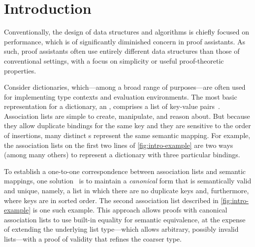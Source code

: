 \section{Introduction}
\label{sec:Introduction}


Conventionally, the design of data structures and algorithms is chiefly focused on performance, which is of significantly diminished concern in proof assistants.
%
As such, proof assistants often use entirely different data structures than those of conventional settings, with a focus on simplicity or useful proof-theoretic properties.

Consider dictionaries, which---among a broad range of purposes---are often used for implementing type contexts and evaluation environments.
%
The most basic representation for a dictionary, an \emph{\sal}, comprises a list of key-value pairs~\citep{XXX,XXX,XXX}.
%
Association lists are simple to create, manipulate, and reason about.
%
But because they allow duplicate bindings for the same key and they are sensitive to the order of insertions, many distinct \sal{}s represent the same semantic mapping.
%
For example, the association lists on the first two lines of \autoref{fig:intro-example}
%
%
are two ways (among many others) to represent a dictionary with three particular bindings.



To establish a one-to-one correspondence between association lists and semantic mappings, one solution~\citet{XXX,XXX,XXX} is to maintain a \emph{canonical} form that is semantically valid and unique, namely, a list in which there are no duplicate keys and, furthermore, where keys are in sorted order.
%
The second association list described in \autoref{fig:intro-example} is one such example.
%
This approach allows proofs with canonical association lists to use built-in equality for semantic equivalence, at the expense of extending the underlying list type---which allows arbitrary, possibly invalid lists---with a proof of validity that refines the coarser type.

